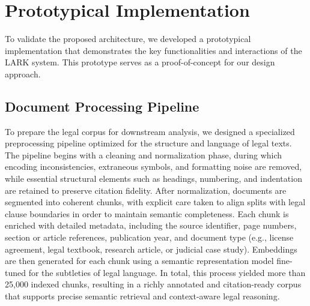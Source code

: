 

\vspace{-.2cm}
\section{Prototypical Implementation}
\label{Section:Prototype}

To validate the proposed architecture, we developed a prototypical implementation that demonstrates the key functionalities and interactions of the LARK system. This prototype serves as a proof-of-concept for our design approach.

\subsection{Document Processing Pipeline}

To prepare the legal corpus for downstream analysis, we designed a specialized preprocessing pipeline optimized for the structure and language of legal texts. The pipeline begins with a cleaning and normalization phase, during which encoding inconsistencies, extraneous symbols, and formatting noise are removed, while essential structural elements such as headings, numbering, and indentation are retained to preserve citation fidelity. After normalization, documents are segmented into coherent chunks, with explicit care taken to align splits with legal clause boundaries in order to maintain semantic completeness. Each chunk is enriched with detailed metadata, including the source identifier, page numbers, section or article references, publication year, and document type (e.g., license agreement, legal textbook, research article, or judicial case study). Embeddings are then generated for each chunk using a semantic representation model fine-tuned for the subtleties of legal language. In total, this process yielded more than 25,000 indexed chunks, resulting in a richly annotated and citation-ready corpus that supports precise semantic retrieval and context-aware legal reasoning.

